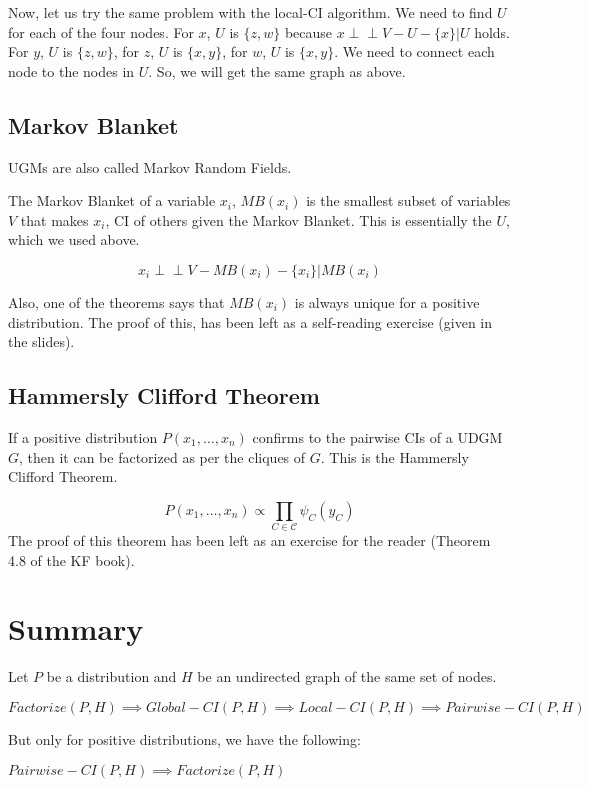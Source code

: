 \documentclass[a4paper,12pt]{article}
\begin{document}
Now, let us try the same problem with the local-CI algorithm. We need to find $U$ for each of the four nodes. For $x$, $U$ is $\{z, w\}$ because $x \perp\!\!\!\perp V - U - \{x\} | U$ holds. For $y$, $U$ is $\{z, w\}$, for $z$, $U$ is $\{x, y\}$, for $w$, $U$ is $\{x, y\}$. We need to connect each node to the nodes in $U$. So, we will get the same graph as above.

\subsection{Markov Blanket}
UGMs are also called Markov Random Fields. 

The Markov Blanket of a variable $x_i$, $MB(x_i)$ is the smallest subset of variables $V$ that makes $x_i$, CI of others given the Markov Blanket. This is essentially the $U$, which we used above. 

\[x_i \perp\!\!\!\perp V - MB(x_i) - \{x_i\} | MB(x_i) \]


Also, one of the theorems says that $MB(x_i)$ is always unique for a positive distribution. The proof of this, has been left as a self-reading exercise (given in the slides).

\subsection{Hammersly Clifford Theorem}
If a positive distribution $P(x_1, \dots, x_n)$ confirms to the pairwise CIs of a UDGM $G$, then it can be factorized as per the cliques of $G$. This is the Hammersly Clifford Theorem. 

\[
P(x_1, \dots, x_n) \propto \prod_{C \in \mathcal{C}} \psi_C(y_C)
\]
The proof of this theorem has been left as an exercise for the reader (Theorem 4.8 of the KF book).


\section{Summary}
Let $P$ be a distribution and $H$ be an undirected graph of the same set of nodes. 

$Factorize(P, H) \implies Global-CI(P, H) \implies Local-CI(P, H) \implies Pairwise-CI(P, H)$

But only for positive distributions, we have the following:

$Pairwise-CI(P, H) \implies Factorize(P, H)$
\end{document}
